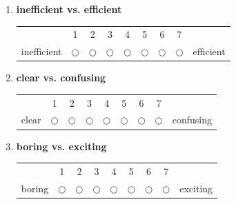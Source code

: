 \documentclass[inscr,ack,preface]{dithesis}
\begin{document}
\begin{appendix}
\begin{enumerate}
    \item \begin{minipage}[t]{\linewidth}
            \textbf{inefficient vs. efficient}
            \begin{center}
              \small
              \renewcommand{\arraystretch}{1.5}
              \begin{tabular}{ccccccccc}
                            & 1          & 2          & 3          & 4          & 5          & 6          & 7          &           \\
                inefficient & $\bigcirc$ & $\bigcirc$ & $\bigcirc$ & $\bigcirc$ & $\bigcirc$ & $\bigcirc$ & $\bigcirc$ & efficient
              \end{tabular}
            \end{center}
          \end{minipage}


    \item \begin{minipage}[t]{\linewidth}
            \textbf{clear vs. confusing}
            \begin{center}
              \small
              \renewcommand{\arraystretch}{1.5}
              \begin{tabular}{ccccccccc}
                      & 1          & 2          & 3          & 4          & 5          & 6          & 7          &           \\
                clear & $\bigcirc$ & $\bigcirc$ & $\bigcirc$ & $\bigcirc$ & $\bigcirc$ & $\bigcirc$ & $\bigcirc$ & confusing
              \end{tabular}
            \end{center}
          \end{minipage}


    \item \begin{minipage}[t]{\linewidth}
            \textbf{boring  vs. exciting}
            \begin{center}
              \small
              \renewcommand{\arraystretch}{1.5}
              \begin{tabular}{ccccccccc}
                       & 1          & 2          & 3          & 4          & 5          & 6          & 7          &          \\
                boring & $\bigcirc$ & $\bigcirc$ & $\bigcirc$ & $\bigcirc$ & $\bigcirc$ & $\bigcirc$ & $\bigcirc$ & exciting
              \end{tabular}
            \end{center}
          \end{minipage}


\end{enumerate}
\end{appendix}
\end{document}
